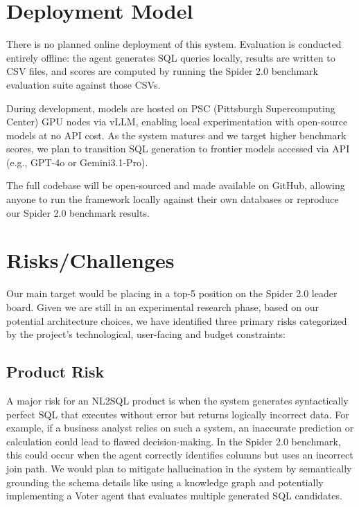 \section{Deployment Model}

There is no planned online deployment of this system. Evaluation is conducted entirely offline: the agent generates SQL queries locally, results are written to CSV files, and scores are computed by running the Spider 2.0 benchmark evaluation suite against those CSVs.

During development, models are hosted on PSC (Pittsburgh Supercomputing Center) GPU nodes via vLLM, enabling local experimentation with open-source models at no API cost. As the system matures and we target higher benchmark scores, we plan to transition SQL generation to frontier models accessed via API (e.g., GPT-4o or Gemini3.1-Pro).

The full codebase will be open-sourced and made available on GitHub, allowing anyone to run the framework locally against their own databases or reproduce our Spider 2.0 benchmark results.

\section{Risks/Challenges}

Our main target would be placing in a top-5 position on the Spider 2.0 leader board. Given we are still in an experimental research phase, based on our potential architecture choices, we have identified three primary risks categorized by the project's technological, user-facing and budget constraints:
\subsection{Product Risk}
A major risk for an NL2SQL product is when the system generates syntactically perfect SQL that executes without error but returns logically incorrect data. For example, if a business analyst relies on such a system, an inaccurate prediction or calculation could lead to flawed decision-making. In the Spider 2.0 benchmark, this could  occur when the agent correctly identifies columns but uses an incorrect join path. We would plan to mitigate hallucination in the system by semantically grounding the schema details like using a knowledge graph and potentially implementing a Voter agent that evaluates multiple generated SQL candidates.

